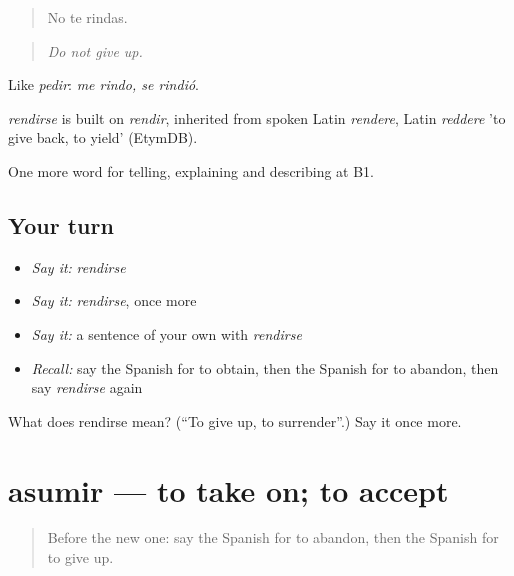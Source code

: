 \begin{quote}
No te rindas.
\end{quote}

\begin{quote}
\emph{Do not give up.}
\end{quote}

Like \emph{pedir}: \emph{me rindo, se rindió}.

\begin{cousinweb}
\emph{rendirse} is built on \emph{rendir}, inherited from spoken Latin \emph{rendere}, Latin \emph{reddere} 'to give back, to yield' (EtymDB).
\end{cousinweb}

\begin{grammarlens}[title={What you've built}]
One more word for telling, explaining and describing at B1.
\end{grammarlens}

\subsection*{Your turn}
\begin{itemize}
\raggedright
  \item \emph{Say it:} \emph{rendirse}
  \item \emph{Say it:} \emph{rendirse}, once more
  \item \emph{Say it:} a sentence of your own with \emph{rendirse}
  \item \emph{Recall:} say the Spanish for to obtain, then the Spanish for to abandon, then say \emph{rendirse} again
\end{itemize}

\begin{tcolorbox}[breakable,colback=teal!4,colframe=teal!35!black,title={Before you move on}]
What does rendirse mean? (\textquotedblleft{}To give up, to surrender\textquotedblright{}.) Say it once more.
\end{tcolorbox}
\section[asumir]{asumir — to take on; to accept}

\label{lesson:ES-C639-asumir}



\begin{quote}
Before the new one: say the Spanish for to abandon, then the Spanish for to give up.
\end{quote}

